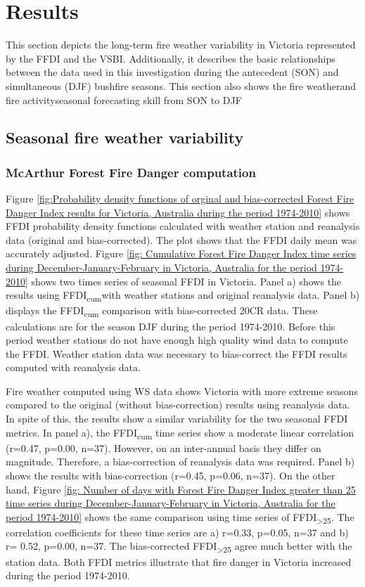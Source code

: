 \section{Results}

This section depicts the long-term fire weather variability in Victoria
represented by the FFDI and the VSBI. Additionally, it describes the
basic relationships between the data used in this investigation during
the antecedent (SON) and simultaneous (DJF) bushfire seasons. This
section also shows the fire weather\textemdash and fire activity\textemdash seasonal
forecasting skill from SON to DJF 


\subsection{Seasonal fire weather variability}


\subsubsection{McArthur Forest Fire Danger computation}

Figure \ref{fig:Probability density functions of orginal and bias-corrected Forest Fire Danger Index results for Victoria, Australia during the period 1974-2010}
shows FFDI probability density functions calculated with weather station
and reanalysis data (original and bias-corrected). The plot shows
that the FFDI daily mean was accurately adjusted. Figure \ref{fig: Cumulative Forest Fire Danger Index time series during December-January-February in Victoria, Australia for the period 1974-2010}
shows two times series of seasonal FFDI in Victoria. Panel a) shows
the results using FFDI\textsubscript{cum}with weather stations and
original reanalysis data. Panel b) displays the FFDI\textsubscript{cum}
comparison with bias-corrected 20CR data. These calculations are for
the season DJF during the period 1974-2010. Before this period weather
stations do not have enough high quality wind data to compute the FFDI. Weather station
data was necessary to bias-correct the FFDI results computed with
reanalysis data. 

Fire weather computed using WS data shows Victoria with more extreme
seasons compared to the original (without bias-correction) results
using reanalysis data. In spite of this, the results show a similar
variability for the two seasonal FFDI metrics. In panel a), the FFDI\textsubscript{cum}
time series show a moderate linear correlation (r=0.47, p=0.00, n=37).
However, on an inter-annual basis they differ on magnitude. Therefore,
a bias-correction of reanalysis data was required. Panel b) shows
the results with bias-correction (r=0.45, p=0.06, n=37). On the other
hand, Figure \ref{fig: Number of days with Forest Fire Danger Index greater than 25 time series during December-January-February in Victoria, Australia for the period 1974-2010}
shows the same comparison using time series of FFDI\textsubscript{>25}.
The correlation coefficients for these time series are a) r=0.33,
p=0.05, n=37 and b) r= 0.52, p=0.00, n=37. The bias-corrected FFDI\textsubscript{>25}
agree much better with the station data. Both FFDI metrics illustrate
that fire danger in Victoria increased during the period 1974-2010.

